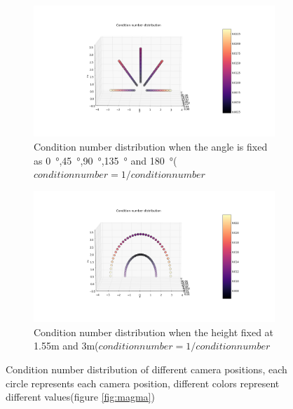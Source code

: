 \begin{figure}[H]
  \centering
  \begin{subfigure}[b]{1.0\textwidth}
    \includegraphics[width=\textwidth]{./fig/cond_num_dis_height.png}
    \caption{Condition number distribution when the angle is fixed as \SI{0}{\degree},\SI{45}{\degree},\SI{90}{\degree},\SI{135}{\degree} and \SI{180}{\degree}($condition number = 1/condition number $ }
  \end{subfigure}
  \begin{subfigure}[b]{1.0\textwidth}
    \includegraphics[width=\textwidth]{./fig/angle_invert_condNum.png}
    \caption{Condition number distribution when the height fixed at 1.55m and 3m($condition number = 1/condition number $}
  \end{subfigure}
  \caption{Condition number distribution of different camera positions, each circle represents each camera position, different colors represent different values(figure \ref{fig:magma})}
  \label{fig:angleHeight_invert_condNum}
\end{figure}  
  
